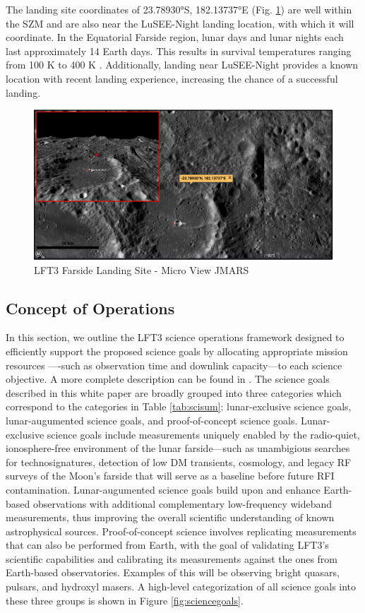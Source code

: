 The landing site coordinates of 23.78930°S, 182.13737°E (Fig. \ref{fig:landing_site}) are well within the SZM and are also near the LuSEE-Night landing location, with which it will coordinate.  In the Equatorial Farside region, lunar days and lunar nights each last approximately 14 Earth days. This results in survival temperatures ranging from 100 K to 400 K \citep{2012JGRE..117.0H18V}.  Additionally, landing near LuSEE-Night provides a known location with recent landing experience, increasing the chance of a successful landing.

\begin{figure}
	\centering
	\includegraphics[width=\linewidth]{figures/Landing site overview.PNG}
	\caption{LFT3 Farside Landing Site - Micro View JMARS}
    \label{fig:landing_site}
\end{figure}

\subsection{Concept of Operations}
\label{sec:conops}
In this section, we outline the LFT3 science operations framework designed to efficiently support the proposed science goals by allocating appropriate mission resources ----such as observation time and downlink capacity---to each science objective. A more complete description can be found in \cite{prabu2025lft3}. The science goals described in this white paper are broadly grouped into three categories which correspond to the categories in Table \ref{tab:scisum}: lunar-exclusive science goals, lunar-augumented science goals, and proof-of-concept science goals. Lunar-exclusive science goals include measurements uniquely enabled by the radio-quiet, ionosphere-free environment of the lunar farside---such as unambigious searches for technosignatures, detection of low DM transients, cosmology, and legacy RF surveys of the Moon's farside that will serve as a baseline before future RFI contamination. Lunar-augumented science goals build upon and enhance Earth-based observations with additional complementary low-frequency wideband measurements, thus improving the overall scientific understanding of known astrophysical sources. Proof-of-concept science involves replicating measurements that can also be performed from Earth, with the goal of validating LFT3's scientific capabilities and calibrating its measurements against the ones from Earth-based observatories. Examples of this will be observing bright quasars, pulsars, and hydroxyl masers. A high-level categorization of all science goals into these three groups is shown in Figure \ref{fig:sciencegoals}.


